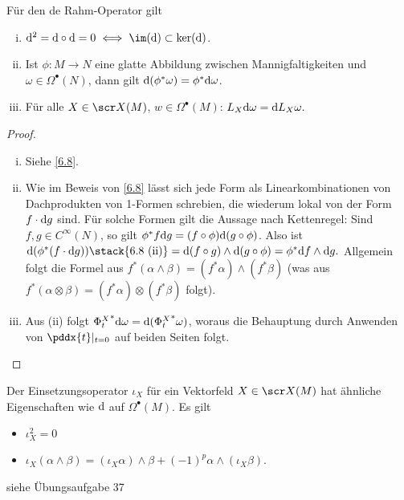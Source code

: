 \begin{st} \label{6.9}
    Für den de Rahm-Operator gilt
    \begin{enumerate}[(i)]
        \item
            $\d^2 = \d \circ \d = 0 \iff \im(\d) \subset \ker(\d)$.
        \item
            Ist $\phi: M \to N$ eine glatte Abbildung zwischen Mannigfaltigkeiten und $\omega \in \Omega^\bullet(N)$, dann gilt $\mathrm{d}(\phi^* \omega) = \phi^* \mathrm{d} \omega$.
        \item
            Für alle $X \in \scr X(M)$, $w \in \Omega^\bullet(M)$:
            \begin{math}
                L_X \mathrm{d} \omega = \mathrm{d} L_X \omega.
            \end{math}
    \end{enumerate}
    \begin{proof}
        \begin{enumerate}[i)]
            \item
                Siehe \ref{6.8}.
            \item
                Wie im Beweis von \ref{6.8} lässt sich jede Form als Linearkombinationen von Dachprodukten von 1-Formen schrebien, die wiederum lokal von der Form $f \cdot \mathrm{d} g$ sind.
                Für solche Formen gilt die Aussage nach Kettenregel:
                Sind $f, g \in C^\infty(N)$, so gilt $\phi^* f \mathrm{d} g = (f \circ \phi) \mathrm{d}(g \circ \phi)$.
                Also ist
                \begin{math}
                    \d(\phi^* (f \cdot \d g))
                    \stack{\text{6.8 (ii)}}= \d(f \circ g) \wedge \d(g \circ \phi)
                    = \phi^* \d f \wedge \d g.
                \end{math}
                Allgemein folgt die Formel aus $f^*(\alpha \wedge \beta) = (f^* \alpha) \wedge (f^* \beta)$ (was aus $f^*(\alpha \otimes \beta) = (f^* \alpha) \otimes (f^* \beta)$ folgt).
            \item
                Aus (ii) folgt ${\Phi^X_t}^* \mathrm{d} \omega = \mathrm{d}({\Phi_t^X}^* \omega)$, woraus die Behauptung durch Anwenden von $\pddx{t}|_{t=0}$ auf beiden Seiten folgt.
        \end{enumerate}
    \end{proof}
\end{st}

\begin{nt} \label{6.10}
    Der Einsetzungsoperator $\iota_X$ für ein Vektorfeld $X \in \scr X(M)$ hat ähnliche Eigenschaften wie $\mathrm{d}$ auf $\Omega^\bullet(M)$.
    Es gilt
    \begin{itemize}
        \item
            $\iota_X^2 = 0$
        \item
            $\iota_X(\alpha \wedge \beta) = (\iota_X \alpha) \wedge \beta + (-1)^p \alpha \wedge (\iota_X \beta)$.
    \end{itemize}
    siehe Übungsaufgabe 37
\end{nt}

